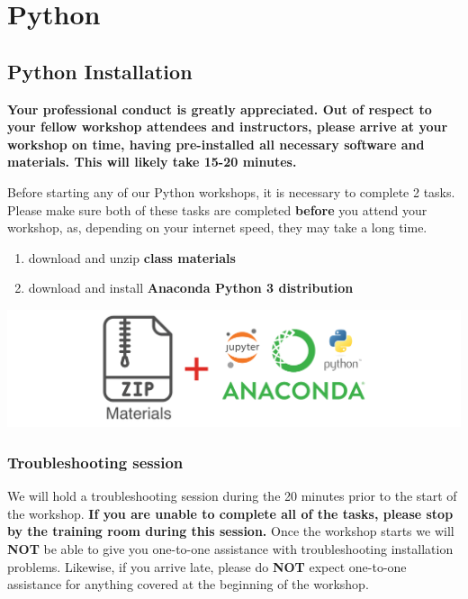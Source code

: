 \documentclass[
]{book}
\providecommand{\tightlist}{%
  \setlength{\itemsep}{0pt}\setlength{\parskip}{0pt}}
\begin{document}
\hypertarget{part-python}{%
\part{Python}\label{part-python}}

\hypertarget{python-installation}{%
\chapter{Python Installation}\label{python-installation}}

\textbf{Your professional conduct is greatly appreciated. Out of respect to your fellow workshop attendees and instructors, please arrive at your workshop on time, having pre-installed all necessary software and materials. This will likely take 15-20 minutes.}

Before starting any of our Python workshops, it is necessary to complete 2 tasks. Please make sure both of these tasks are completed \textbf{before} you attend your workshop, as, depending on your internet speed, they may take a long time.

\begin{enumerate}
\def\labelenumi{\arabic{enumi}.}
\tightlist
\item
  download and unzip \textbf{class materials}
\item
  download and install \textbf{Anaconda Python 3 distribution}
\end{enumerate}

\includegraphics{Python/PythonInstall/images/install_software_Python.png}

\hypertarget{troubleshooting-session-1}{%
\section{Troubleshooting session}\label{troubleshooting-session-1}}

We will hold a troubleshooting session during the 20 minutes prior to the start of the workshop.
\textbf{If you are unable to complete all of the tasks, please stop by the training room during this session.}
Once the workshop starts we will \textbf{NOT} be able to give you one-to-one assistance with troubleshooting installation problems. Likewise, if you arrive late, please do \textbf{NOT} expect one-to-one assistance for anything covered at the beginning of the workshop.
\end{document}
